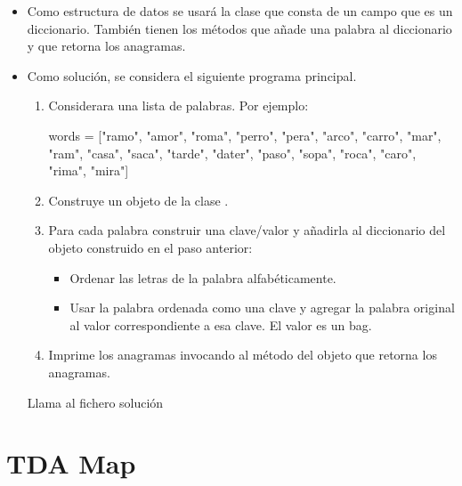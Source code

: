 \begin{itemize}

\item Como estructura de datos se usará la clase  que consta de un campo que es un diccionario. También tienen los métodos  que añade una palabra al diccionario y  que retorna los anagramas.

\item Como solución, se considera el siguiente programa principal.
\begin{enumerate}
\item 
Considerara una lista de palabras. Por ejemplo:

\begin{pyverbatim}
words = ["ramo", "amor", "roma", "perro", "pera", "arco", "carro", "mar", "ram", "casa", "saca",
         "tarde", "dater", "paso", "sopa", "roca", "caro", "rima", "mira"]
\end{pyverbatim}

\item Construye un objeto de la clase  .

\item Para cada palabra construir una clave/valor y añadirla al diccionario del objeto construido en el paso anterior:
	\begin{itemize}
	\item 
	Ordenar las letras de la palabra alfabéticamente.

	\item
	Usar la palabra ordenada como una clave y agregar la palabra original al valor correspondiente a esa clave.
	El valor es un bag.
	\end{itemize}

\item
Imprime los anagramas invocando al método del objeto que retorna los anagramas.
\end{enumerate}


Llama al fichero solución 

\end{itemize}




\separacion
\section{TDA Map}\label{sec:TDAMap}

